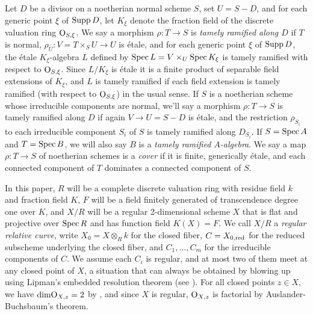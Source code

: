 \documentclass{amsart}
\theoremstyle{plain}
\theoremstyle{definition}
\theoremstyle{remark}
\numberwithin{equation}{section}%
\renewcommand{\O}{{\text{\rm O}}}
\renewcommand{\dim}{{\text{\rm dim}}}
\newcommand{\red}{{\text{\rm red}}}
\newcommand{\Supp}{{\text{\rm Supp}}}
\newcommand{\Spec}{{\text{\rm Spec}\,}}
\begin{document}
Let $D$ be a divisor on a noetherian normal
scheme $S$, set $U=S-D$, and for each generic point $\xi$ of $\Supp\,D$, let $K_\xi$
denote the fraction field of the discrete valuation ring $\O_{S,\xi}$.
We say a morphism $\rho:T\to S$
is {\it tamely ramified along $D$} if $T$ is normal, $\rho_U:V=T\times_S U\to U$ is \'etale,
and for each generic point $\xi$ of $\Supp\,D$, the \'etale $K_\xi$-algebra $L$ defined by
$\Spec L=V\times_U\Spec K_\xi$ is tamely ramified with respect to $\O_{S,\xi}$.
Since $L/K_\xi$ is \'etale it is a finite product of separable field extensions
of $K_\xi$, and $L$ is tamely ramified if each field extension is tamely ramified 
(with respect to $\O_{S,\xi}$) in the usual sense.
If $S$ is a noetherian scheme whose irreducible components are normal, we'll
say a morphism $\rho:T\to S$ is tamely ramified along $D$ if again $V\to U=S-D$ is \'etale,
and the restriction $\rho_{S_i}$
to each irreducible component $S_i$ of $S$ is tamely ramified along $D_{S_i}$.
If $S=\Spec A$ and $T=\Spec B$, we will also say $B$ is a {\it tamely ramified $A$-algebra}.
We say a map $\rho:T\to S$ of noetherian schemes 
is a {\it cover} if it is finite, generically \'etale, 
and each connected component of $T$ dominates a connected component of $S$.




\label{setup}
In this paper, $R$ will be a complete discrete valuation ring with residue field $k$
and fraction field $K$, 
$F$ will be a field finitely generated of transcendence degree one over $K$,
and $X/R$ will be
a regular 2-dimensional scheme $X$ that is flat and projective over $\Spec R$
and has function field $K(X)=F$.  We call $X/R$ a {\it regular relative curve}, 
write $X_0=X\otimes_R k$ for the closed fiber,
$C=X_{0,\red}$ for the reduced subscheme underlying the closed fiber, 
and $C_1,\dots,C_m$ for the irreducible components of $C$.
We assume each $C_i$ is regular, and at most two of them meet at any closed point of $X$,
a situation that can always  be obtained by blowing up using Lipman's embedded resolution theorem
(see \cite[9.2.4]{Liu}).
For all closed points $z\in X$, we have $\dim\O_{X,z}=2$ by \cite[8.3.4(c)]{Liu},
and since $X$ is regular, $\O_{X,z}$ is factorial by Auslander-Buchsbaum's theorem.
\end{document}
